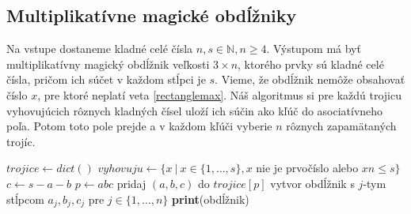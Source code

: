\subsection{Multiplikatívne magické obdĺžniky}

\begin{alg}
\label{algmmos}
Na vstupe dostaneme kladné celé čísla $n,s \in \mathbb{N}, n \geq 4$. Výstupom má byť multiplikatívny magický obdĺžnik veľkosti $3 \times n$, ktorého prvky sú kladné celé čísla, pričom ich súčet v každom stĺpci je $s$. Vieme, že obdĺžnik nemôže obsahovať číslo $x$, pre ktoré neplatí veta \ref{rectanglemax}. Náš algoritmus si pre každú trojicu vyhovujúcich rôznych kladných čísel uloží ich súčin ako kľúč do asociatívneho poľa. Potom toto pole prejde a v každom kľúči vyberie $n$ rôznych zapamätaných trojíc.
\end{alg}

\begin{algorithmic}
\STATE $trojice \gets dict()$
\STATE $vyhovuju \gets \{x ~|~ x \in \{1, \dots , s\}, x$ nie je prvočíslo alebo $xn \leq s\}$
	\STATE $c \gets s-a-b$
		\STATE $p \gets abc$
		\STATE pridaj $(a,b,c)$ do $trojice[p]$
	\ENDIF
\ENDFOR
{}
				\STATE vytvor obdĺžnik s $j$-tym stĺpcom $a_{j}, b_{j}, c_{j}$ pre $j \in \{1, \dots , n\}$
					\STATE \textbf{print}(obdĺžnik)
				\ENDIF
			\ENDFOR
		\ENDIF
	\ENDFOR
\ENDFOR
\end{algorithmic}



